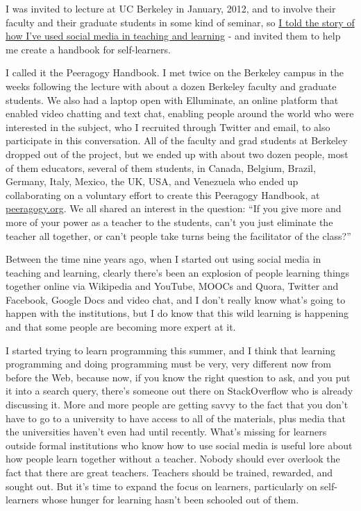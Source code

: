 I was invited to lecture at UC Berkeley in January, 2012, and to involve
their faculty and their graduate students in some kind of seminar, so
\href{http://vimeo.com/35685124}{I told the story of how I've used
social media in teaching and learning} - and invited them to help me
create a handbook for self-learners.

I called it the Peeragogy Handbook. I met twice on the Berkeley campus
in the weeks following the lecture with about a dozen Berkeley faculty
and graduate students. We also had a laptop open with Elluminate, an
online platform that enabled video chatting and text chat, enabling
people around the world who were interested in the subject, who I
recruited through Twitter and email, to also participate in this
conversation. All of the faculty and grad students at Berkeley dropped
out of the project, but we ended up with about two dozen people, most of
them educators, several of them students, in Canada, Belgium, Brazil,
Germany, Italy, Mexico, the UK, USA, and Venezuela who ended up
collaborating on a voluntary effort to create this Peeragogy Handbook,
at \href{http://peeragogy.org/}{peeragogy.org}. We all shared an
interest in the question: ``If you give more and more of your power as a
teacher to the students, can't you just eliminate the teacher all
together, or can't people take turns being the facilitator of the
class?''

Between the time nine years ago, when I started out using social media
in teaching and learning, clearly there's been an explosion of people
learning things together online via Wikipedia and YouTube, MOOCs and
Quora, Twitter and Facebook, Google Docs and video chat, and I don't
really know what's going to happen with the institutions, but I do know
that this wild learning is happening and that some people are becoming
more expert at it.

I started trying to learn programming this summer, and I think that
learning programming and doing programming must be very, very different
now from before the Web, because now, if you know the right question to
ask, and you put it into a search query, there's someone out there on
StackOverflow who is already discussing it. More and more people are
getting savvy to the fact that you don't have to go to a university to
have access to all of the materials, plus media that the universities
haven't even had until recently. What's missing for learners outside
formal institutions who know how to use social media is useful lore
about how people learn together without a teacher. Nobody should ever
overlook the fact that there are great teachers. Teachers should be
trained, rewarded, and sought out. But it's time to expand the focus on
learners, particularly on self-learners whose hunger for learning hasn't
been schooled out of them.

